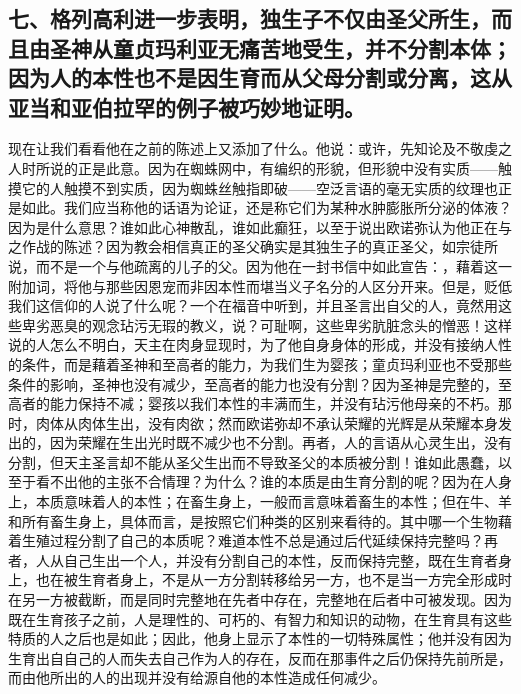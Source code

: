 
\subsection{七、格列高利进一步表明，独生子不仅由圣父所生，而且由圣神从童贞玛利亚无痛苦地受生，并不分割本体；因为人的本性也不是因生育而从父母分割或分离，这从亚当和亚伯拉罕的例子被巧妙地证明。}

现在让我们看看他在之前的陈述上又添加了什么。他说：或许，先知论及不敬虔之人时所说的正是此意。因为在蜘蛛网中，有编织的形貌，但形貌中没有实质——触摸它的人触摸不到实质，因为蜘蛛丝触指即破——空泛言语的毫无实质的纹理也正是如此。我们应当称他的话语为论证，还是称它们为某种水肿膨胀所分泌的体液？因为是什么意思？谁如此心神散乱，谁如此癫狂，以至于说出欧诺弥认为他正在与之作战的陈述？因为教会相信真正的圣父确实是其独生子的真正圣父，如宗徒所说，而不是一个与他疏离的儿子的父。因为他在一封书信中如此宣告：，藉着这一附加词，将他与那些因恩宠而非因本性而堪当义子名分的人区分开来。但是，贬低我们这信仰的人说了什么呢？一个在福音中听到，并且圣言出自父的人，竟然用这些卑劣恶臭的观念玷污无瑕的教义，说？可耻啊，这些卑劣肮脏念头的憎恶！这样说的人怎么不明白，天主在肉身显现时，为了他自身身体的形成，并没有接纳人性的条件，而是藉着圣神和至高者的能力，为我们生为婴孩；童贞玛利亚也不受那些条件的影响，圣神也没有减少，至高者的能力也没有分割？因为圣神是完整的，至高者的能力保持不减；婴孩以我们本性的丰满而生，并没有玷污他母亲的不朽。那时，肉体从肉体生出，没有肉欲；然而欧诺弥却不承认荣耀的光辉是从荣耀本身发出的，因为荣耀在生出光时既不减少也不分割。再者，人的言语从心灵生出，没有分割，但天主圣言却不能从圣父生出而不导致圣父的本质被分割！谁如此愚蠢，以至于看不出他的主张不合情理？为什么？谁的本质是由生育分割的呢？因为在人身上，本质意味着人的本性；在畜生身上，一般而言意味着畜生的本性；但在牛、羊和所有畜生身上，具体而言，是按照它们种类的区别来看待的。其中哪一个生物藉着生殖过程分割了自己的本质呢？难道本性不总是通过后代延续保持完整吗？再者，人从自己生出一个人，并没有分割自己的本性，反而保持完整，既在生育者身上，也在被生育者身上，不是从一方分割转移给另一方，也不是当一方完全形成时在另一方被截断，而是同时完整地在先者中存在，完整地在后者中可被发现。因为既在生育孩子之前，人是理性的、可朽的、有智力和知识的动物，在生育具有这些特质的人之后也是如此；因此，他身上显示了本性的一切特殊属性；他并没有因为生育出自自己的人而失去自己作为人的存在，反而在那事件之后仍保持先前所是，而由他所出的人的出现并没有给源自他的本性造成任何减少。\par

